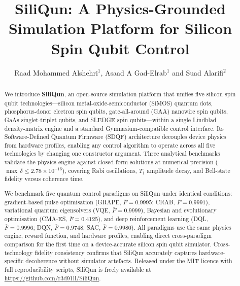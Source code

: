 \documentclass{iopjournal}
\begin{document}

\title{SiliQun: A Physics-Grounded Simulation Platform for Silicon Spin Qubit Control}

\author{Raad Mohammed Alshehri$^1$, Asaad A Gad-Elrab$^1$ and Suad Alarifi$^2$}




\begin{abstract}
We introduce \textbf{SiliQun}, an open-source simulation platform that unifies
five silicon spin qubit technologies---silicon metal-oxide-semiconductor (SiMOS)
quantum dots, phosphorus-donor electron spin qubits, gate-all-around (GAA)
nanowire spin qubits, GaAs singlet-triplet qubits, and SLEDGE spin qubits---within
a single Lindblad density-matrix engine and a standard Gymnasium-compatible
control interface. Its Software-Defined Quantum Firmware (SDQF) architecture
decouples device physics from hardware profiles, enabling any control algorithm
to operate across all five technologies by changing one constructor argument.
Three analytical benchmarks validate the physics engine against closed-form
solutions at numerical precision ($\max\,\delta \leq 2.78 \times 10^{-16}$),
covering Rabi oscillations, $T_1$ amplitude decay, and Bell-state fidelity
versus coherence time.

We benchmark five quantum control paradigms on SiliQun under identical
conditions: gradient-based pulse optimisation (GRAPE, $\bar{F} = 0.9995$;
CRAB, $\bar{F} = 0.9991$), variational quantum eigensolvers
(VQE, $\bar{F} = 0.9999$), Bayesian and evolutionary optimisation
(CMA-ES, $\bar{F} = 0.4125$), and deep reinforcement learning
(DQL, $\bar{F} = 0.9996$; DQN, $\bar{F} = 0.9748$; SAC, $\bar{F} = 0.9980$).
All paradigms use the same physics engine, reward function, and hardware
profiles, enabling direct cross-paradigm comparison for the first time on a
device-accurate silicon spin qubit simulator. Cross-technology fidelity
consistency confirms that SiliQun accurately captures hardware-specific
decoherence without simulator artefacts. Released under the MIT licence with
full reproducibility scripts, SiliQun is freely available at
\url{https://github.com/r3d91ll/SiliQun}.
\end{abstract}
\end{document}

